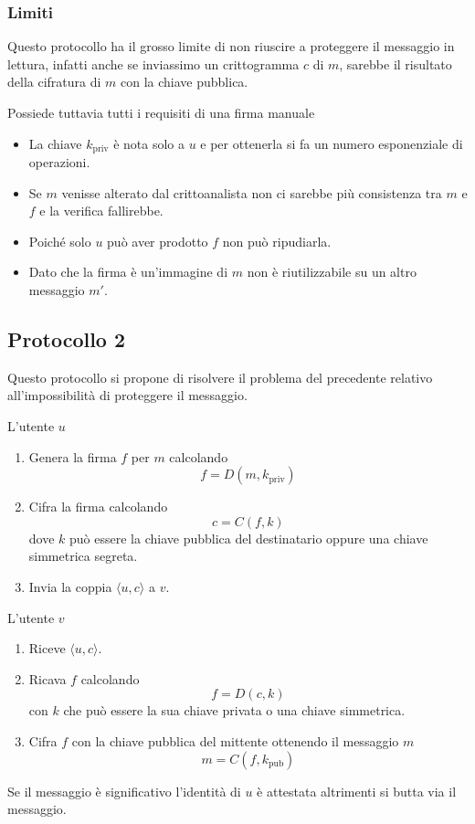 \subsubsection{Limiti}
Questo protocollo ha il grosso limite di non riuscire a proteggere il messaggio in lettura, infatti anche se
inviassimo un crittogramma $c$ di $m$, sarebbe il risultato della cifratura di $m$ con la chiave pubblica.

Possiede tuttavia tutti i requisiti di una firma manuale
\begin{itemize}
	\item La chiave $k_\text{priv}$ \`e nota solo a $u$ e per ottenerla si fa un numero esponenziale di operazioni.
	\item Se $m$ venisse alterato dal crittoanalista non ci sarebbe pi\`u consistenza tra $m$ e $f$ e la verifica
	      fallirebbe.
	\item Poich\'e solo $u$ pu\`o aver prodotto $f$ non pu\`o ripudiarla.
	\item Dato che la firma \`e un'immagine di $m$ non \`e riutilizzabile su un altro messaggio $m'$.
\end{itemize}

\subsection{Protocollo 2}
Questo protocollo si propone di risolvere il problema del precedente relativo all'impossibilit\`a di proteggere il
messaggio.

L'utente $u$
\begin{enumerate}
	\item Genera la firma $f$ per $m$ calcolando
	      \[ f = D(m, k_\text{priv}) \]
	\item Cifra la firma calcolando
	      \[ c = C(f, k) \]
	      dove $k$ pu\`o essere la chiave pubblica del destinatario oppure una chiave simmetrica segreta.
	\item Invia la coppia $\langle u, c \rangle$ a $v$.
\end{enumerate}
L'utente $v$
\begin{enumerate}
	\item Riceve $\langle u, c \rangle$.
	\item Ricava $f$ calcolando
	      \[ f = D(c, k) \]
	      con $k$ che pu\`o essere la sua chiave privata o una chiave simmetrica.
	\item Cifra $f$ con la chiave pubblica del mittente ottenendo il messaggio $m$
	      \[ m = C(f, k_\text{pub}) \]
\end{enumerate}
Se il messaggio \`e significativo l'identit\`a di $u$ \`e attestata altrimenti si butta via il messaggio.

